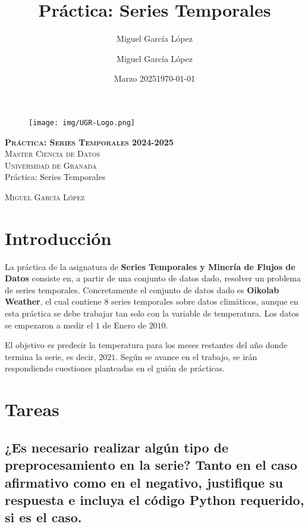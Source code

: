 \documentclass[12pt,letterpaper]{article}
\title{Práctica: Series Temporales}
\author{Miguel García López}
\date{Marzo 2025}
\author{Miguel García López} %
\date{\normalsize\today} %
\begin{document}
\begin{titlepage}
    \begin{figure}
        \vspace{-1.3cm}
        \begin{center}
            \texttt{[image: img/UGR-Logo.png]}
        \end{center}
    \end{figure}
    \vspace{1.3cm}
    \centering
    \normalfont \normalsize
    \textsc{\textbf{Práctica: Series Temporales 2024-2025} \\ \vspace{.15cm} Master Ciencia de Datos\\ \vspace{.15cm} Universidad de Granada} \\ [25pt]
    \huge Práctica: Series Temporales

    \normalfont \normalsize \vspace{.30cm}
    \textsc{Miguel García López}

\end{titlepage}

\tableofcontents
\listoffigures
\listoftables
\newpage

\section{Introducción}
La práctica de la asignatura de \textbf{Series Temporales y Minería de Flujos de Datos} consiste en, a partir de una conjunto de datos dado, resolver un problema de series temporales. Concretamente el conjunto de datos dado es \textbf{Oikolab Weather}, el cual contiene $8$ series temporales sobre datos climáticos, aunque en esta práctica se debe trabajar tan solo con la variable de temperatura. Los datos se empezaron a medir el $1$ de Enero de $2010$.

El objetivo es predecir la temperatura para los meses restantes del año donde termina la serie, es decir, $2021$. Según se avance en el trabajo, se irán respondiendo cuestiones planteadas en el guión de prácticas.

\section{Tareas}
\subsection{¿Es necesario realizar algún tipo de preprocesamiento en la serie? Tanto en el caso
    afirmativo como en el negativo, justifique su respuesta e incluya el código Python
    requerido, si es el caso.}
\end{document}
